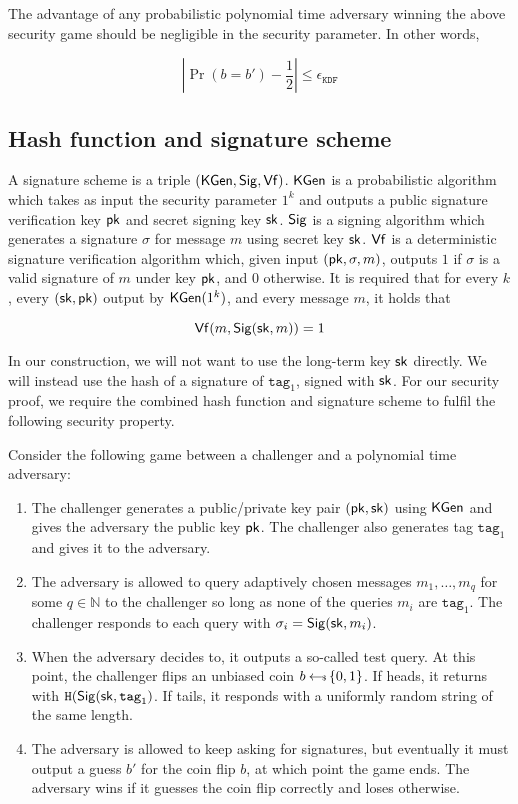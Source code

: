 \documentclass[12pt]{article}
\begin{document}
The advantage of any probabilistic polynomial time adversary winning the above security game should be negligible in the security parameter. In other words,

$$
\left \vert \Pr(b = b') - \frac{1}{2} \right \vert \le \epsilon_{\texttt{KDF}}
$$

\subsection{Hash function and signature scheme}
A signature scheme is a triple $(\mathsf{KGen}, \mathsf{Sig}, \mathsf{Vf})$. $\mathsf{KGen}$ is a probabilistic algorithm which takes as input the security parameter $1^k$ and outputs a public signature verification key $\mathsf{pk}$ and secret signing key $\mathsf{sk}$. $\mathsf{Sig}$ is a signing algorithm which generates a signature $\sigma$ for message $m$ using secret key $\mathsf{sk}$. $\mathsf{Vf}$ is a deterministic signature verification algorithm which, given input $(\mathsf{pk}, \sigma, m)$, outputs $1$ if $\sigma$ is a valid signature of $m$ under key $\mathsf{pk}$, and $0$ otherwise. It is required that for every $k$, every $(\mathsf{sk}, \mathsf{pk})$ output by $\mathsf{KGen} (1^k)$, and every message $m$, it holds that

$$\mathsf{Vf} (m , \mathsf{Sig} ({\mathsf{sk}, m})) = 1$$

In our construction, we will not want to use the long-term key $\mathsf{sk}$ directly. We will instead use the hash of a signature of $\texttt{tag}_1$, signed with $\mathsf{sk}$. For our security proof, we require the combined hash function and signature scheme to fulfil the following  security property.

Consider the following game between a challenger and a polynomial time adversary:

\begin{enumerate}
\item The challenger generates a public/private key pair $(\mathsf{pk}, \mathsf{sk})$ using $\mathsf{KGen}$ and gives the adversary the public key $\mathsf{pk}$. The challenger also generates tag $\texttt{tag}_1$ and gives it to the adversary.

\item The adversary is allowed to query adaptively chosen messages $m_1,
	\dots , m_q$ for some $q \in \mathbb{N}$ to the challenger so long as none of the queries $m_i$ are $\texttt{tag}_1$. The
		challenger responds to each query with $\sigma_{i}=
		\mathsf{Sig}{(\mathsf{sk}, m_i})$. 

\item When the adversary decides to, it outputs a so-called test query. At this point, the challenger flips an unbiased coin $b \hskip2.3pt{\gets\!\!\mbox{\tiny${\$}$\normalsize}}\, \{0, 1\}$. If heads, it returns with $ \texttt{H}(\mathsf{Sig} (\mathsf{sk}, \mathrm{\texttt{tag}_1})$. If tails, it responds with a uniformly random string of the same length.

\item The adversary is allowed to keep asking for signatures, but eventually it must output a guess $b'$ for the coin flip $b$, at which point the game ends. The adversary wins if it guesses the coin flip correctly and loses otherwise.
\end{enumerate}
\end{document}

